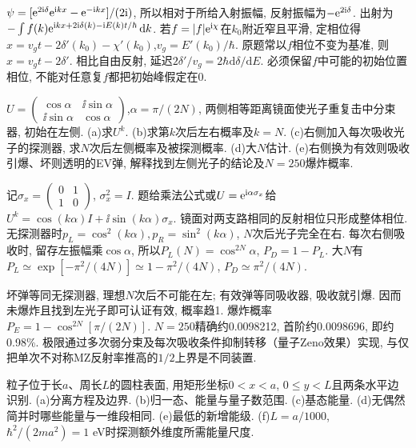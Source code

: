 \begin{solution}
$\psi=[\mathrm e^{2\mathrm i\delta}\mathrm e^{\mathrm i kx}-\mathrm e^{-\mathrm i kx}]/(2\mathrm i)$, 所以相对于所给入射振幅, 反射振幅为$-\mathrm e^{2\mathrm i\delta}$. 出射为$-\int f(k)\mathrm e^{\mathrm i kx+2\mathrm i\delta(k)-\mathrm i E(k)t/\hbar}\,\mathrm d k$. 若$f=|f|\mathrm e^{\mathrm i\chi}$在$k_0$附近窄且平滑, 定相位得$x=v_g t-2\delta'(k_0)-\chi'(k_0)$,$v_g=E'(k_0)/\hbar$. 原题常以$f$相位不变为基准, 则$x=v_gt-2\delta'$. 相比自由反射, 延迟$2\delta'/v_g=2\hbar\mathrm d\delta/\mathrm dE$. 必须保留$f$中可能的初始位置相位, 不能对任意复$f$都把初始峰假定在0.
\end{solution}
\begin{exercise}
$U=\left(\begin{smallmatrix}\cos\alpha&\ii\sin\alpha\\\ii\sin\alpha&\cos\alpha\end{smallmatrix}\right)$,$\alpha=\pi/(2N)$, 两侧相等距离镜面使光子重复击中分束器, 初始在左侧. (a)求$U^k$. (b)求第$k$次后左右概率及$k=N$. (c)右侧加入每次吸收光子的探测器, 求$N$次后左侧概率及被探测概率. (d)大$N$估计. (e)右侧换为有效则吸收引爆、坏则透明的EV弹, 解释找到左侧光子的结论及$N=250$爆炸概率.
\end{exercise}
\begin{solution}
记$\sigma_x=\left(\begin{smallmatrix}0&1\\1&0\end{smallmatrix}\right)$, $\sigma_x^2=I$. 题给乘法公式或$U=\mathrm e^{\mathrm i\alpha\sigma_x}$给$U^k=\cos(k\alpha)I+\ii\sin(k\alpha)\sigma_x$. 镜面对两支路相同的反射相位只形成整体相位. 无探测器时$p_L=\cos^2(k\alpha),p_R=\sin^2(k\alpha)$, $N$次后光子完全在右. 每次右侧吸收时, 留存左振幅乘$\cos\alpha$, 所以$P_L(N)=\cos^{2N}\alpha$, $P_D=1-P_L$. 大$N$有$P_L\simeq\exp[-\pi^2/(4N)]\simeq1-\pi^2/(4N)$, $P_D\simeq\pi^2/(4N)$.

坏弹等同无探测器, 理想$N$次后不可能在左; 有效弹等同吸收器, 吸收就引爆. 因而未爆炸且找到左光子即可认证有效, 概率趋1. 爆炸概率$P_E=1-\cos^{2N}[\pi/(2N)]$. $N=250$精确约0.0098212, 首阶约0.0098696, 即约0.98\%. 极限通过多次弱分束及每次吸收条件抑制转移（量子Zeno效果）实现, 与仅把单次不对称MZ反射率推高的$1/2$上界是不同装置.
\end{solution}
\begin{exercise}
粒子位于长$a$、周长$L$的圆柱表面, 用矩形坐标$0<x<a$, $0\leq y<L$且两条水平边识别. (a)分离方程及边界. (b)归一态、能量与量子数范围. (c)基态能量. (d)无偶然简并时哪些能量与一维段相同. (e)最低的新增能级. (f)$L=a/1000$, $\hbar^2/(2ma^2)=1$ eV时探测额外维度所需能量尺度.
\end{exercise}
